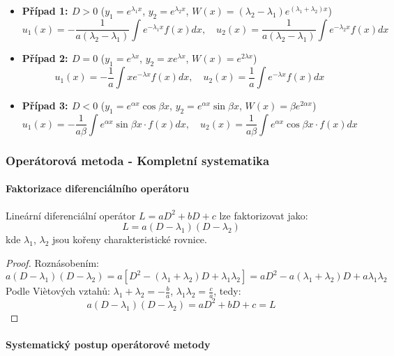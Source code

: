 \begin{itemize}
\item \textbf{Případ 1: $D > 0$} ($y_1 = e^{\lambda_1 x}$, $y_2 = e^{\lambda_2 x}$, $W(x) = (\lambda_2 - \lambda_1)e^{(\lambda_1 + \lambda_2)x}$)
\[
u_1(x) = -\frac{1}{a(\lambda_2 - \lambda_1)}\int e^{-\lambda_1 x} f(x) dx, \quad u_2(x) = \frac{1}{a(\lambda_2 - \lambda_1)}\int e^{-\lambda_2 x} f(x) dx
\]

\item \textbf{Případ 2: $D = 0$} ($y_1 = e^{\lambda x}$, $y_2 = xe^{\lambda x}$, $W(x) = e^{2\lambda x}$)
\[
u_1(x) = -\frac{1}{a}\int x e^{-\lambda x} f(x) dx, \quad u_2(x) = \frac{1}{a}\int e^{-\lambda x} f(x) dx
\]

\item \textbf{Případ 3: $D < 0$} ($y_1 = e^{\alpha x}\cos\beta x$, $y_2 = e^{\alpha x}\sin\beta x$, $W(x) = \beta e^{2\alpha x}$)
\[
u_1(x) = -\frac{1}{a\beta}\int e^{\alpha x}\sin\beta x \cdot f(x) dx, \quad u_2(x) = \frac{1}{a\beta}\int e^{\alpha x}\cos\beta x \cdot f(x) dx
\]
\end{itemize}

\subsubsection{Operátorová metoda - Kompletní systematika}
\label{subsubsec:operatorova-metoda}

\paragraph{Faktorizace diferenciálního operátoru}

\begin{theorem}
Lineární diferenciální operátor $L = aD^2 + bD + c$ lze faktorizovat jako:
\[
L = a(D - \lambda_1)(D - \lambda_2)
\]
kde $\lambda_1$, $\lambda_2$ jsou kořeny charakteristické rovnice.
\end{theorem}

\begin{proof}
Roznásobením:
\[
a(D - \lambda_1)(D - \lambda_2) = a[D^2 - (\lambda_1 + \lambda_2)D + \lambda_1\lambda_2] = aD^2 - a(\lambda_1 + \lambda_2)D + a\lambda_1\lambda_2
\]
Podle Viètových vztahů: $\lambda_1 + \lambda_2 = -\frac{b}{a}$, $\lambda_1\lambda_2 = \frac{c}{a}$, tedy:
\[
a(D - \lambda_1)(D - \lambda_2) = aD^2 + bD + c = L
\]
\end{proof}

\paragraph{Systematický postup operátorové metody}


